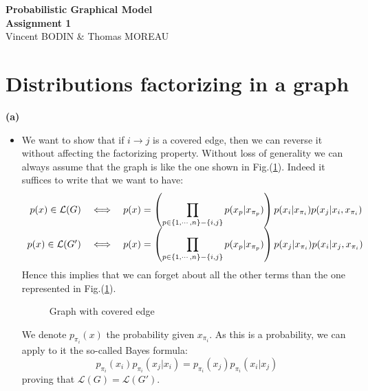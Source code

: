 \documentclass[10pt]{article}
\begin{document}
\begin{center}
\huge\textbf{Probabilistic Graphical Model\\ \Large
Assignment 1}\normalsize \\
\vspace{0.5cm}
Vincent BODIN \& Thomas MOREAU
\end{center}

\hrulefill
\vspace{1cm}


\section{Distributions factorizing in a graph}


\textbf{(a) }\begin{itemize}
\item We want to show that if $i \rightarrow j$ is a covered edge, then we can reverse it without affecting the factorizing property. Without loss of generality we can always assume that the graph is like the one shown in Fig.(\ref{fig1}). Indeed it suffices to write that we want to have:
\begin{equation}
\begin{array}{r l l}
p(x) \in \mathcal{L}(G) 	& \iff & \displaystyle p(x) = \left( \prod_{p\in \{1,\cdots, n\} - \{i,j\} } p(x_p | x_{\pi_p}) \right) p(x_i | x_{\pi_i}) p(x_j | x_i, x_{\pi_i}) \\ 
p(x) \in \mathcal{L}(G')  & \iff & \displaystyle p(x) = \left( \prod_{p\in \{1,\cdots, n\} - \{i,j\} } p(x_p | x_{\pi_p}) \right) p(x_j | x_{\pi_i}) p(x_i | x_j, x_{\pi_i})
\end{array}
\end{equation}
Hence this implies that we can forget about all the other terms than the one represented in Fig.(\ref{fig1}).
\begin{figure}[h!]
\centering
{}
\caption{Graph with covered edge}
\label{fig1}
\end{figure}

We denote $p_{\pi_i}(x)$ the probability given $x_{\pi_i}$. As this is a probability, we can apply to it the so-called Bayes formula: 
\begin{equation}
p_{\pi_i}(x_i) p_{\pi_i}(x_j | x_i) = p_{\pi_i}(x_j) p_{\pi_i}(x_i | x_j) 
\label{eq:}
\end{equation}
proving that $\mathcal{L}(G) = \mathcal{L}(G')$.




\end{itemize}
\end{document}
